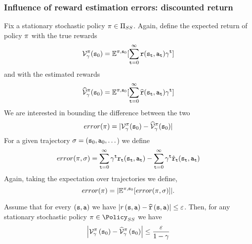 \subsubsection{Influence of reward estimation errors: discounted return}

Fix a stationary stochastic policy $\pi\in {\Pi _{SS}}$.
Again, define the expected return of policy $\pi$ with the true
rewards
\[
\mathcal{V}^\pi_\gamma({\tt s}_0)=\mathbb{E}^{\pi,{\tt s}_0}[\sum_{{\tt t}=0}^\infty
{\tt r}({\tt s}_{\tt t},{\tt a}_{\tt t})\gamma^{\tt t}]
\]
and with the estimated rewards
\[
\widehat{\mathcal{V}}^\pi_\gamma({\tt s}_0)=\mathbb{E}^{\pi,{\tt s}_0}[\sum_{{\tt t}=0}^\infty
\widehat{{\tt r}}({\tt s}_{\tt t},{\tt a}_{\tt t})\gamma^{\tt t} ]
\]
We are interested in bounding the difference between the two
\[
error(\pi)=|\mathcal{V}^\pi_\gamma({\tt s}_0)-\widehat{\mathcal{V}}^\pi_\gamma({\tt s}_0)|
\]
For a given trajectory
$\sigma=({\tt s}_0,{\tt a}_0,\ldots$)
we define
\[
error(\pi,\sigma)= \sum_{{\tt t}=0}^\infty \gamma^{\tt t}
{\tt r}_{\tt t}({\tt s}_{\tt t},{\tt a}_{\tt t})- \sum_{{\tt t}=0}^\infty
\gamma^{\tt t} \hat{{\tt r}}_{\tt t}({\tt s}_{\tt t},{\tt a}_{\tt t})
\]
Again, taking the expectation over trajectories we define,
\[
error(\pi)=|\mathbb{E}^{\pi,{\tt s}_0} [error(\pi,\sigma)]|.
\]

\begin{lemma}
\label{lemma:approx-disc-error}
%
Assume that for every $\left({\tt s},{\tt a}\right)$ we have $\left|r\left({\tt s},{\tt a}\right)-\widehat{{\tt r}}\left({\tt s},{\tt a}\right)\right|\leq\varepsilon$.
Then, for any stationary stochastic policy $\policy\in\Policy_{SS}$ we have
\[
\left|\mathcal{V}_{\gamma}^{\pi}\left({\tt s}_{0}\right)-\widehat{\mathcal{V}}_{\gamma}^{\pi}\left({\tt s}_{0}\right)\right|\leq\frac{\varepsilon}{1-\gamma}
\]
\end{lemma}

